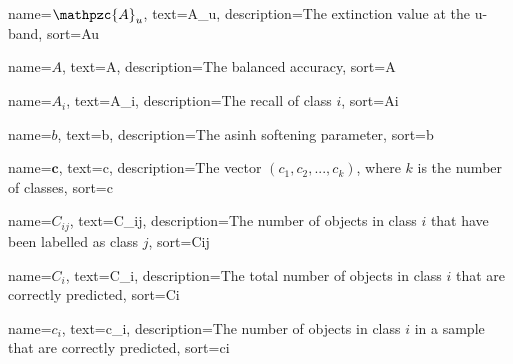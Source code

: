 

\providecommand\given{}
\DeclarePairedDelimiterXPP\E[1]{\mathbb{E}}{[}{]}{}{
	\renewcommand\given{  \nonscript\:
		\delimsize\vert
		\nonscript\:
		\mathopen{}
		\allowbreak}
	#1
}
\DeclarePairedDelimiterXPP\Prob[1]{\mathbb{P}}{(}{)}{}{
	\renewcommand\given{  \nonscript\:
		\delimsize\vert
		\nonscript\:
		\mathopen{}
		\allowbreak}
	#1
}
\DeclareMathOperator{\Beta}{Beta}
\DeclareMathOperator{\Bin}{Bin}
\DeclareMathOperator{\arsinh}{arsinh}
\newcommand{\A}{\mathpzc{A}}
\newcommand{\B}{\mathcal{B}}
\newcommand{\X}{\mathcal{X}}
\newcommand{\Y}{\mathcal{Y}}
\newcommand{\Unlabelled}{\mathcal{U}}
\newcommand{\Labelled}{\mathcal{L}}
\newcommand{\R}{\mathcal{R}}
\newcommand*{\argmin}{\operatornamewithlimits{argmin}\limits}
\newcommand*{\argmax}{\operatornamewithlimits{argmax}\limits}

%
{%
	name={$\A_u$},
	text={A_u},
	description={The extinction value at the u-band},
	sort={Au}
}

%
{%
	name={$A$},
	text={A},
	description={The balanced accuracy},
	sort={A}
}

%
{%
	name={$A_i$},
	text={A_i},
	description={The recall of class $i$},
	sort={Ai}
}

%
{%
	name={$b$},
	text={b},
	description={The asinh softening parameter},
	sort={b}
}

%
{%
	name={$\bm{c}$},
	text={c},
	description={The vector $(c_1, c_2,...,c_k)$, where $k$ is the number of classes},
	sort={c}
}

%
{%
	name={$C_{ij}$},
	text={C_ij},
	description={The number of objects in class $i$ that have been labelled as class $j$},
	sort={Cij}
}

%
{%
	name={$C_i$},
	text={C_i},
	description={The total number of objects in class $i$ that are correctly predicted},
	sort={Ci}
}

%
{%
	name={$c_i$},
	text={c_i},
	description={The number of objects in class $i$ in a sample that are correctly predicted},
	sort={ci}
}

